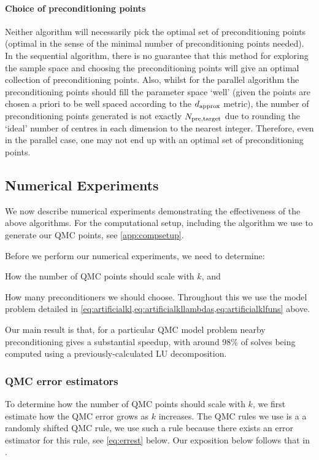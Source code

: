 \paragraph{Choice of preconditioning points} Neither algorithm will necessarily pick the optimal set of preconditioning points (optimal in the sense of the minimal number of preconditioning points needed). In the sequential algorithm, there is no guarantee that this method for exploring the sample space and choosing the preconditioning points will give an optimal collection of preconditioning points. Also, whilst for the parallel algorithm the preconditioning points should fill the parameter space `well' (given the points are chosen a priori to be well spaced according to the $d_{\mathrm{approx}}$ metric), the number of preconditioning points generated is not exactly $N_{\mathrm{pre,target}}$ due to rounding the `ideal' number of centres in each dimension to the nearest integer. Therefore, even in the parallel case, one may not end up with an optimal set of preconditioning points.

\subsection{Numerical Experiments}\label{sec:nbpcqmcnumerics}
We now describe numerical experiments demonstrating the effectiveness of the above algorithms. For the computational setup, including the algorithm we use to generate our QMC points, see \cref{app:compsetup}.

Before we perform our numerical experiments, we need to determine:
\bit
\item How the number of QMC points should scale with $k$, and
  \item How many preconditioners we should choose.
    \eit
    Throughout this  we use the model problem detailed in \cref{eq:artificialkl,eq:artificialkllambdas,eq:artificialklfuns} above.

        Our main result is that, for a particular QMC model problem nearby preconditioning gives a substantial speedup, with around 98\% of solves being computed using a previously-calculated LU decomposition.

\subsubsection{QMC error estimators}
    
    To determine how the number of QMC points should scale with $k$, we first estimate how the QMC error grows as $k$ increases. The QMC rules we use is a a randomly shifted QMC rule, we use such a rule because there exists an error estimator for this rule, see \cref{eq:errest} below. Our exposition below follows that in \cite[Section 4.2]{GrKuNuScSl:11}.

